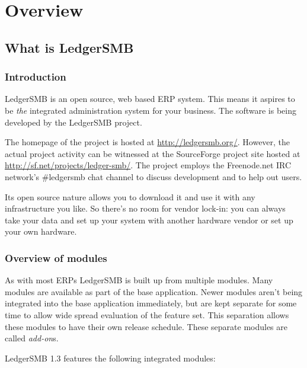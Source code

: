 
\part{Overview}



\chapter{What is LedgerSMB}

\section{Introduction}
LedgerSMB is an open source, web based ERP system. This means it aspires to be
\textit{the} integrated administration system for your business.
The software is being developed by the LedgerSMB project.

The homepage of the project is hosted at \url{http://ledgersmb.org/}.
However, the actual project activity can be witnessed at the SourceForge
project site hosted at \url{http://sf.net/projects/ledger-smb/}.  The project
employs the Freenode.net IRC network's \#ledgersmb chat channel to discuss development
and to help out users.

Its open source nature allows you to download it and use it with any
infrastructure you like. So there's no room for vendor lock-in: you can
always take your data and set up your system with another hardware vendor
or set up your own hardware.

\section{Overview of modules}
\label{sec:ModuleOverview}
As with most ERPs LedgerSMB is built up from multiple modules.  Many modules are
available as part of the base application.  Newer modules aren't being integrated
into the base application immediately, but are kept separate for some time to allow
wide spread evaluation of the feature set.  This separation allows these modules
to have their own release schedule.  These separate modules are called \textit{add-on}s.

LedgerSMB 1.3 features the following integrated modules:

